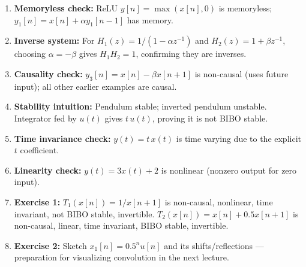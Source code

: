 \documentclass[11pt]{article}
\begin{document}
\begin{enumerate}
  \item \textbf{Memoryless check:} ReLU $y[n] = \max(x[n],0)$ is memoryless; $y_1[n] = x[n] + \alpha y_1[n-1]$ has memory.
  \item \textbf{Inverse system:} For $H_1(z) = 1/(1-\alpha z^{-1})$ and $H_2(z) = 1 + \beta z^{-1}$, choosing $\alpha = -\beta$ gives $H_1 H_2 = 1$, confirming they are inverses.
  \item \textbf{Causality check:} $y_3[n] = x[n] - \beta x[n+1]$ is non-causal (uses future input); all other earlier examples are causal.
  \item \textbf{Stability intuition:} Pendulum stable; inverted pendulum unstable. Integrator fed by $u(t)$ gives $t\,u(t)$, proving it is not BIBO stable.
  \item \textbf{Time invariance check:} $y(t) = t\,x(t)$ is time varying due to the explicit $t$ coefficient.
  \item \textbf{Linearity check:} $y(t) = 3 x(t) + 2$ is nonlinear (nonzero output for zero input).
  \item \textbf{Exercise 1:} $T_1(x[n]) = 1/x[n+1]$ is non-causal, nonlinear, time invariant, not BIBO stable, invertible. $T_2(x[n]) = x[n] + 0.5 x[n+1]$ is non-causal, linear, time invariant, BIBO stable, invertible.
  \item \textbf{Exercise 2:} Sketch $x_1[n] = 0.5^n u[n]$ and its shifts/reflections — preparation for visualizing convolution in the next lecture.
\end{enumerate}
\end{document}
